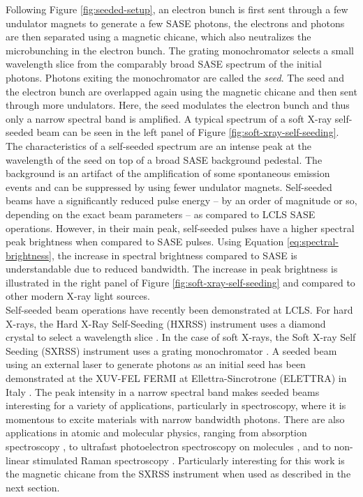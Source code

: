 Following Figure \ref{fig:seeded-setup}, an electron bunch is first sent through a few undulator magnets to generate a few SASE photons, the electrons and photons are then separated using a magnetic chicane, which also neutralizes the microbunching in the electron bunch. The grating monochromator selects a small wavelength slice from the comparably broad SASE spectrum of the initial photons. Photons exiting the monochromator are called the \textit{seed}. The seed and the electron bunch are overlapped again using the magnetic chicane and then sent through more undulators. Here, the seed modulates the electron bunch and thus only a narrow spectral band is amplified. A typical spectrum of a soft X-ray self-seeded beam can be seen in the left panel of Figure \ref{fig:soft-xray-self-seeding}. The characteristics of a self-seeded spectrum are an intense peak at the wavelength of the seed on top of a broad SASE background pedestal. The background is an artifact of the amplification of some spontaneous emission events and can be suppressed by using fewer undulator magnets. Self-seeded beams have a significantly reduced pulse energy -- by an order of magnitude or so, depending on the exact beam parameters -- as compared to LCLS SASE operations. However, in their main peak, self-seeded pulses have a higher spectral peak brightness when compared to SASE pulses. Using Equation \eqref{eq:spectral-brightness}, the increase in spectral brightness compared to SASE is understandable due to reduced bandwidth. The increase in peak brightness is illustrated in the right panel of Figure \ref{fig:soft-xray-self-seeding} and compared to other modern X-ray light sources.\\[1\baselineskip]
%
Self-seeded beam operations have recently been demonstrated at LCLS. For hard X-rays, the Hard X-Ray Self-Seeding (HXRSS) instrument uses a diamond crystal to select a wavelength slice \citep{Amann-2012-NatPho}. In the case of soft X-rays, the Soft X-ray Self Seeding (SXRSS) instrument uses a grating monochromator \citep{Ratner-2015-PRL}. A seeded beam using an external laser to generate photons as an initial seed has been demonstrated at the XUV-FEL FERMI at Ellettra-Sincrotrone (ELETTRA) in Italy \citep{Allaria-2012-NatPho}. The peak intensity in a narrow spectral band makes seeded beams interesting for a variety of applications, particularly in spectroscopy, where it is momentous to excite materials with narrow bandwidth photons. There are also applications in atomic and molecular physics, ranging from absorption spectroscopy \citep{Ferguson-2014-Unpublished}, to ultrafast photoelectron spectroscopy on molecules \citep{Bucher-2014-Unpublished}, and to non-linear stimulated Raman spectroscopy \citep{Kimberg-2016-FD}. Particularly interesting for this work is the magnetic chicane from the SXRSS instrument when used as described in the next section.
%
%
%
%
